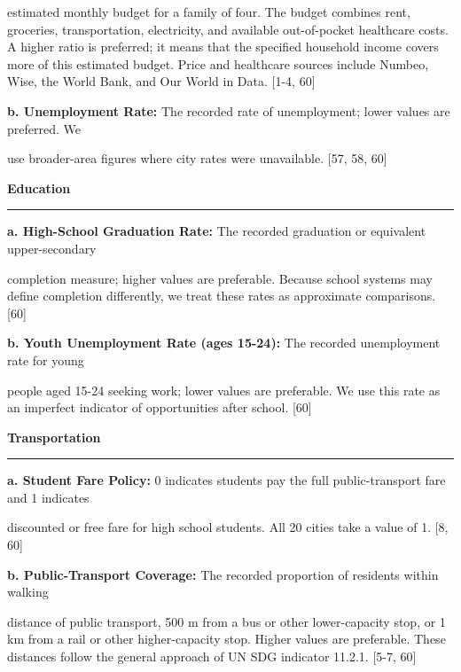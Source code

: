 \documentclass[11pt,letterpaper]{article}
\begin{document}
estimated monthly budget for a family of four. The budget combines rent, groceries, 
transportation, electricity, and available out-of-pocket healthcare costs. A higher ratio is 
preferred; it means that the specified household income covers more of this estimated 
budget. Price and healthcare sources include Numbeo, Wise, the World Bank, and Our 
World in Data. [1-4, 60]


\par\noindent\textbf{b. Unemployment Rate:} The recorded rate of unemployment; lower values are preferred. We


use broader-area figures where city rates were unavailable. [57, 58, 60]


\par\medskip\noindent\textbf{\large Education}\par\vspace{2pt}\hrule\vspace{5pt}


\par\noindent\textbf{a. High-School Graduation Rate:} The recorded graduation or equivalent upper-secondary


completion measure; higher values are preferable. Because school systems may define 
completion differently, we treat these rates as approximate comparisons. [60]


\par\noindent\textbf{b. Youth Unemployment Rate (ages 15-24):} The recorded unemployment rate for young


people aged 15-24 seeking work; lower values are preferable. We use this rate as an 
imperfect indicator of opportunities after school. [60]


\par\medskip\noindent\textbf{\large Transportation}\par\vspace{2pt}\hrule\vspace{5pt}


\par\noindent\textbf{a. Student Fare Policy:} 0 indicates students pay the full public-transport fare and 1 indicates


discounted or free fare for high school students. All 20 cities take a value of 1. [8, 60]


\par\noindent\textbf{b. Public-Transport Coverage:} The recorded proportion of residents within walking


distance of public transport, 500 m from a bus or other lower-capacity stop, or 1 km from a 
rail or other higher-capacity stop. Higher values are preferable. These distances follow the 
general approach of UN SDG indicator 11.2.1. [5-7, 60]
\end{document}
